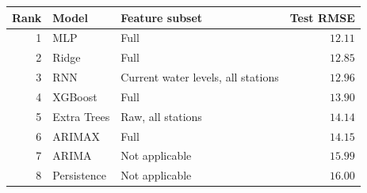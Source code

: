 \begin{tabularx}{\textwidth}{@{}rlXr@{}}
\toprule
\textbf{Rank} & \textbf{Model} & \textbf{Feature subset} & \textbf{Test RMSE} \\
\midrule
1 & MLP & Full & $12.11$ \\
2 & Ridge & Full & $12.85$ \\
3 & RNN & Current water levels, all stations & $12.96$ \\
4 & XGBoost & Full & $13.90$ \\
5 & Extra Trees & Raw, all stations & $14.14$ \\
6 & ARIMAX & Full & $14.15$ \\
7 & ARIMA & Not applicable & $15.99$ \\
8 & Persistence & Not applicable & $16.00$ \\
\bottomrule
\end{tabularx}
